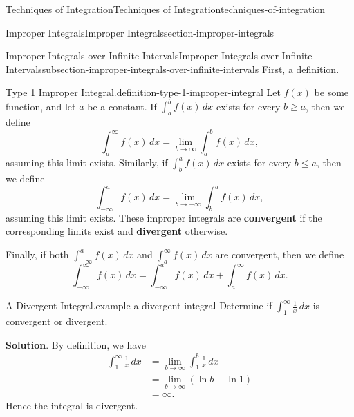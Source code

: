 \documentclass[oneside,10pt,]{book}
\newcommand{\terminology}[1]{\textbf{#1}}
\numberwithin{equation}{section}
\begin{document}
\begin{chapterptx}{Techniques of Integration}{}{Techniques of Integration}{}{}{techniques-of-integration}
\begin{sectionptx}{Improper Integrals}{}{Improper Integrals}{}{}{section-improper-integrals}
\begin{introduction}{}
\end{introduction}%
%
%
\typeout{************************************************}
\typeout{************************************************}
%
\begin{subsectionptx}{Improper Integrals over Infinite Intervals}{}{Improper Integrals over Infinite Intervals}{}{}{subsection-improper-integrals-over-infinite-intervals}
\hypertarget{p-579}{}%
First, a definition.%
\begin{definition}{Type 1 Improper Integral.}{definition-type-1-improper-integral}%
\hypertarget{p-580}{}%
Let \(f(x)\) be some function, and let \(a\) be a constant. If \(\int_{a}^{b}f(x)\,dx\) exists for every \(b\geq a\), then we define%
\begin{equation*}
\int_{a}^{\infty}f(x)\,dx = \lim_{b\to\infty}\int_{a}^{b}f(x)\,dx,
\end{equation*}
assuming this limit exists. Similarly, if \(\int_{b}^{a}f(x)\,dx\) exists for every \(b\leq a\), then we define%
\begin{equation*}
\int_{-\infty}^{a}f(x)\,dx = \lim_{b\to-\infty}\int_{b}^{a}f(x)\,dx,
\end{equation*}
assuming this limit exists. These improper integrals are \terminology{convergent} if the corresponding limits exist and \terminology{divergent} otherwise.%
\par
\hypertarget{p-581}{}%
Finally, if both \(\int_{-\infty}^{a}f(x)\,dx\) and \(\int_{a}^{\infty}f(x)\,dx\) are convergent, then we define%
\begin{equation*}
\int_{-\infty}^{\infty}f(x)\,dx = \int_{-\infty}^{a}f(x)\,dx + \int_{a}^{\infty}f(x)\,dx.
\end{equation*}
%
\end{definition}
\begin{example}{A Divergent Integral.}{example-a-divergent-integral}%
\hypertarget{p-582}{}%
Determine if \(\int_{1}^{\infty}\frac{1}{x}\,dx\) is convergent or divergent.%
\par\smallskip%
\noindent\textbf{Solution}.\hypertarget{solution-126}{}\quad%
\hypertarget{p-583}{}%
By definition, we have%
\begin{align*}
\int_{1}^{\infty}\frac{1}{x}\,dx & = \lim_{b\to\infty}\int_{1}^{b}\frac{1}{x}\,dx \\
& = \lim_{b\to\infty}(\ln b - \ln 1) \\
& = \infty. 
\end{align*}
Hence the integral is divergent.%

\end{example}
\end{subsectionptx}
\end{sectionptx}
\end{chapterptx}
\end{document}
